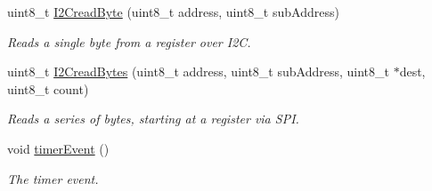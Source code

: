 \begin{DoxyCompactItemize}
uint8\+\_\+t \hyperlink{classLSM9DS1_a7fc046d4b335494331905fdeb5c81c9e}{I2\+Cread\+Byte} (uint8\+\_\+t address, uint8\+\_\+t sub\+Address)
\begin{DoxyCompactList}\small\item\em Reads a single byte from a register over I2C. \end{DoxyCompactList}\item 
uint8\+\_\+t \hyperlink{classLSM9DS1_adfc9a22290daddd7787e8023fa8f12cc}{I2\+Cread\+Bytes} (uint8\+\_\+t address, uint8\+\_\+t sub\+Address, uint8\+\_\+t $\ast$dest, uint8\+\_\+t count)
\begin{DoxyCompactList}\small\item\em Reads a series of bytes, starting at a register via S\+PI. \end{DoxyCompactList}\item 
\mbox{\label{classLSM9DS1_ad1fffc2bc5987339430d3b293da0bdd1}} 
void \hyperlink{classLSM9DS1_ad1fffc2bc5987339430d3b293da0bdd1}{timer\+Event} ()
\begin{DoxyCompactList}\small\item\em The timer event. \end{DoxyCompactList}\end{DoxyCompactItemize}
